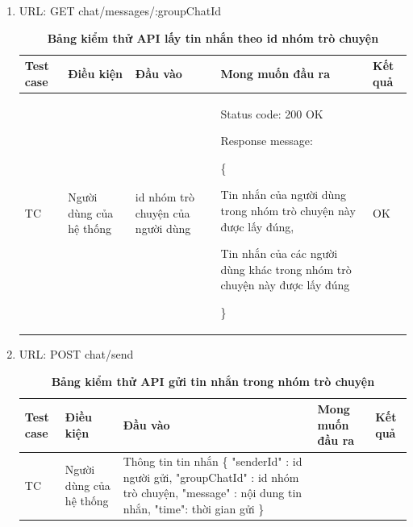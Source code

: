 \begin{enumerate}
	\item URL: GET chat/messages/:groupChatId
	      \begin{xltabular}{\textwidth}{
		      | >{\raggedright\arraybackslash}p{1cm}
		      | >{\raggedright\arraybackslash}p{2.5cm}
		      | >{\raggedright\arraybackslash}X
		      | >{\raggedright\arraybackslash}X
		      | >{\raggedright\arraybackslash}p{1cm}|
		      }
		      \caption{\bfseries \fontsize{12pt}{0pt}\selectfont Bảng kiểm thử API lấy tin nhắn theo id nhóm trò chuyện}
		      \\
		      \hline
		      \bfseries Test case    &\bfseries Điều kiện   &\bfseries Đầu vào
		      &\bfseries Mong muốn đầu ra &\bfseries Kết quả\\ \hline


		      TC
		      & Người dùng của hệ thống
		      & id nhóm trò chuyện của người dùng
		      &

		      Status code: 200 OK

		      Response message:

		      \{

		      Tin nhắn của người dùng trong nhóm trò chuyện này được lấy đúng,

		      Tin nhắn của các người dùng khác trong nhóm trò chuyện này được lấy đúng

		      \}

		      & OK

		      \\ \hline

	      \end{xltabular}

	\item URL: POST chat/send
	      \begin{xltabular}{\textwidth}{
		      | >{\raggedright\arraybackslash}p{1cm}
		      | >{\raggedright\arraybackslash}p{2.5cm}
		      | >{\raggedright\arraybackslash}X
		      | >{\raggedright\arraybackslash}X
		      | >{\raggedright\arraybackslash}p{1cm}|
		      }
		      \caption{\bfseries \fontsize{12pt}{0pt}\selectfont Bảng kiểm thử API gửi tin nhắn trong nhóm trò chuyện}
		      \\
		      \hline
		      \bfseries Test case    &\bfseries Điều kiện   &\bfseries Đầu vào
		      &\bfseries Mong muốn đầu ra &\bfseries Kết quả\\ \hline


		      TC
		      & Người dùng của hệ thống
		      & Thông tin tin nhắn
		      \{
		      "senderId" : id người gửi,
		      "groupChatId" : id nhóm trò chuyện,
		      "message" : nội dung tin nhắn,
		      "time": thời gian gửi
		      \}
		      &


\end{xltabular}
\end{enumerate}
